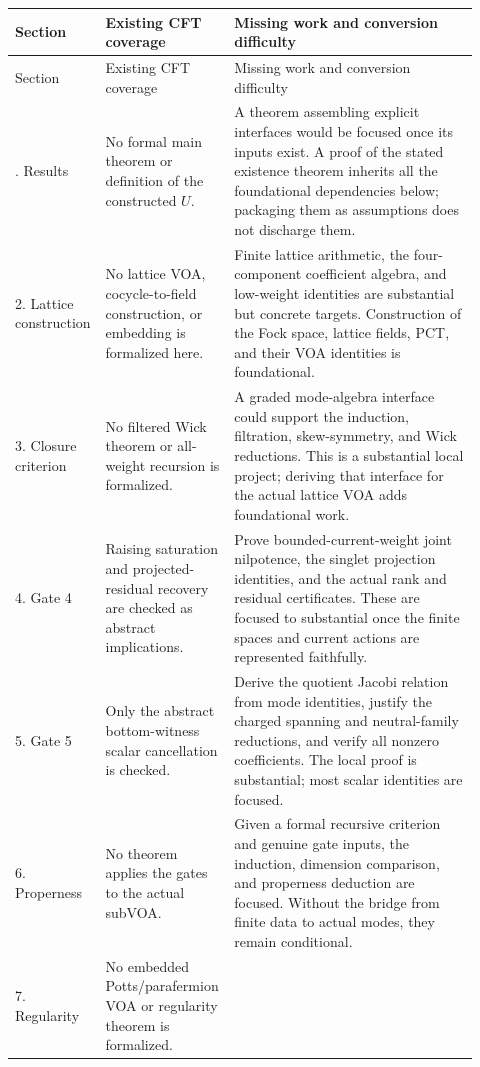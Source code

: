 \begin{longtable}{@{}P{0.15\linewidth}P{0.25\linewidth}P{0.52\linewidth}@{}}
\toprule
Section & Existing CFT coverage & Missing work and conversion difficulty\\
\midrule\endfirsthead
\toprule
Section & Existing CFT coverage & Missing work and conversion difficulty\\
\midrule\endhead
\bottomrule{}. Results
& No formal main theorem or definition of the constructed $U$.
& A theorem assembling explicit interfaces would be focused once its
inputs exist. A proof of the stated existence theorem inherits all
the foundational dependencies below; packaging them as assumptions
does not discharge them.\\
2. Lattice construction
& No lattice VOA, cocycle-to-field construction, or embedding is
formalized here.
& Finite lattice arithmetic, the four-component coefficient algebra,
and low-weight identities are substantial but concrete targets.
Construction of the Fock space, lattice fields, PCT, and their VOA
identities is foundational.\\
3. Closure criterion
& No filtered Wick theorem or all-weight recursion is formalized.
& A graded mode-algebra interface could support the induction,
filtration, skew-symmetry, and Wick reductions. This is a substantial
local project; deriving that interface for the actual lattice VOA
adds foundational work.\\
4. Gate 4
& Raising saturation and projected-residual recovery are checked as
abstract implications.
& Prove bounded-current-weight joint nilpotence, the singlet
projection identities, and the actual rank and residual certificates.
These are focused to substantial once the finite spaces and current
actions are represented faithfully.\\
5. Gate 5
& Only the abstract bottom-witness scalar cancellation is checked.
& Derive the quotient Jacobi relation from mode identities, justify
the charged spanning and neutral-family reductions, and verify all
nonzero coefficients. The local proof is substantial; most scalar
identities are focused.\\
6. Properness
& No theorem applies the gates to the actual subVOA.
& Given a formal recursive criterion and genuine gate inputs, the
induction, dimension comparison, and properness deduction are focused.
Without the bridge from finite data to actual modes, they remain
conditional.\\
7. Regularity
& No embedded Potts/parafermion VOA or regularity theorem is formalized.

\end{longtable}
